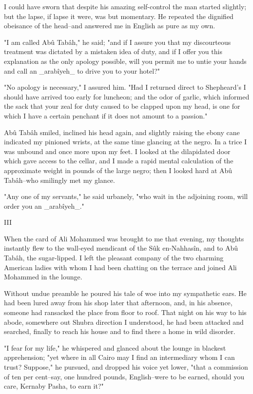 I could have sworn that despite his amazing self-control the man
started slightly; but the lapse, if lapse it were, was but momentary.
He repeated the dignified obeisance of the head--and answered me in
English as pure as my own.

"I am called Abû Tabâh," he said; "and if I assure you that my
discourteous treatment was dictated by a mistaken idea of duty, and if
I offer you this explanation as the only apology possible, will you
permit me to untie your hands and call an _arabîyeh_ to drive you to
your hotel?"

"No apology is necessary," I assured him. "Had I returned direct to
Shepheard's I should have arrived too early for luncheon; and the odor
of garlic, which informed the sack that your zeal for duty caused to
be clapped upon my head, is one for which I have a certain penchant if
it does not amount to a passion."

Abû Tabâh smiled, inclined his head again, and slightly raising the
ebony cane indicated my pinioned wrists, at the same time glancing at
the negro. In a trice I was unbound and once more upon my feet. I
looked at the dilapidated door which gave access to the cellar, and I
made a rapid mental calculation of the approximate weight in pounds of
the large negro; then I looked hard at Abû Tabâh--who smilingly met my
glance.

"Any one of my servants," he said urbanely, "who wait in the adjoining
room, will order you an _arabîyeh_."


III

When the card of Ali Mohammed was brought to me that evening, my
thoughts instantly flew to the wall-eyed mendicant of the Sûk
en-Nahhasîn, and to Abû Tabâh, the sugar-lipped. I left the pleasant
company of the two charming American ladies with whom I had been
chatting on the terrace and joined Ali Mohammed in the lounge.

Without undue preamble he poured his tale of woe into my sympathetic
ears. He had been lured away from his shop later that afternoon, and,
in his absence, someone had ransacked the place from floor to roof.
That night on his way to his abode, somewhere out Shubra direction I
understood, he had been attacked and searched, finally to reach his
house and to find there a home in wild disorder.

"I fear for my life," he whispered and glanced about the lounge in
blackest apprehension; "yet where in all Cairo may I find an
intermediary whom I can trust? Suppose," he pursued, and dropped his
voice yet lower, "that a commission of ten per cent--say, one hundred
pounds, English--were to be earned, should you care, Kernaby Pasha,
to earn it?"

